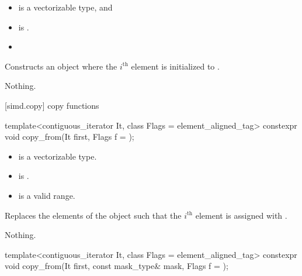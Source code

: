 \begin{itemdescr}
  \pnum\constraints
  \begin{itemize}
    \item {} is a vectorizable type, and
    \item {} is .
  \end{itemize}

  \pnum\expects
  \begin{itemize}
    \item \validMaskedRange
  \end{itemize}

  \pnum\effects
  Constructs an object where the $i^\text{th}$ element is initialized to  \foralli.

  \pnum\throws Nothing.
\end{itemdescr}

[simd.copy]{ copy functions}

\begin{itemdecl}
template<contiguous_iterator It, class Flags = element_aligned_tag>
  constexpr void copy_from(It first, Flags f = {});
\end{itemdecl}

\begin{itemdescr}
  \pnum\constraints
  \begin{itemize}
    \item {} is a vectorizable type.
    \item {} is .
  \end{itemize}

  \pnum\requires
  \begin{itemize}
    \item \tcode{[first, first + size())} is a valid range.
  \end{itemize}

  \pnum\effects
  Replaces the elements of the  object such that the $i^\text{th}$ element is assigned with  \foralli.

  \pnum\throws Nothing.
\end{itemdescr}

\begin{itemdecl}
template<contiguous_iterator It, class Flags = element_aligned_tag>
  constexpr void copy_from(It first, const mask_type& mask, Flags f = {});
\end{itemdecl}

